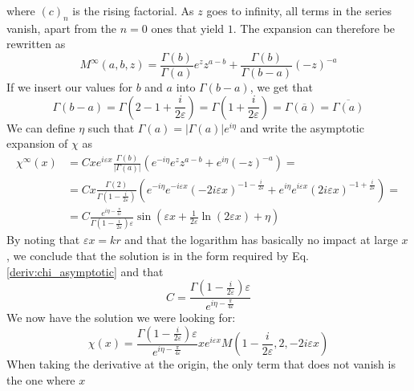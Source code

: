 where \((c)_n\) is the rising factorial. As \(z\) goes to infinity, all terms in the series vanish, apart from the \(n=0\) ones that yield \(1\). The expansion can therefore be rewritten as
\begin{equation}\label{deriv:Mexpansion}
	M^{\infty} (a,b,z) =
	\frac{\Gamma (b)}{\Gamma (a)} e^z z^{a-b} +
	\frac{\Gamma (b)}{\Gamma (b-a)}(-z)^{-a}
\end{equation}
If we insert our values for \(b\) and \(a\) into \(\Gamma (b-a)\), we get that
\begin{equation}
	\Gamma (b-a) = \Gamma \left( 2- 1 + \frac{i}{2\varepsilon } \right) = \Gamma \left( 1+ \frac{i}{2 \varepsilon } \right) = \Gamma (\overline{a})= \overline{\Gamma (a)}
\end{equation}
We can define \(\eta \) such that \(\Gamma (a) = \vert \Gamma (a) \vert e^{i \eta } \) and write the asymptotic expansion of \(\chi \) as
\begin{align}
	\chi^{\infty}(x) &= Cxe^{i\varepsilon x} \frac{\Gamma (b)}{\vert \Gamma (a) \vert }
	\left( e^{-i \eta } e^z	z^{a-b} + e^{i \eta } (-z)^{-a}  \right) =\\
	&= C x \frac{\Gamma (2)}{\Gamma \left(1-\frac{i}{2\varepsilon }\right)}\left( e^{-i \eta } e^{-i\varepsilon x}(-2i\varepsilon x)^{-1-\frac{i}{2\varepsilon }} + e^{i \eta } e^{i \varepsilon x} (2i \varepsilon x)^{-1+ \frac{i}{2\varepsilon }} \right)=\\
	&=C \frac{e^{i \eta - \frac{\pi}{4 \varepsilon }}}{\Gamma \left( 1-\frac{i}{2\varepsilon } \right) \varepsilon } \sin \left( \varepsilon x + \frac{1}{2\varepsilon} \ln (2\varepsilon x) + \eta \right)
\end{align}
By noting that \(\varepsilon x= kr\) and that the logarithm has basically no impact at large \(x\), we conclude that the solution is in the form required by Eq. \eqref{deriv:chi_asymptotic} and that
\begin{equation}
	C = \frac{\Gamma \left( 1- \frac{i}{2\varepsilon }\right) \varepsilon }{e^{i \eta - \frac{\pi}{4 \varepsilon }}}
\end{equation}
We now have the solution we were looking for:
\begin{equation}\label{deriv:solution}
	\chi (x) = \frac{\Gamma \left(1-\frac{i}{2\varepsilon }\right) \varepsilon }{e^{i \eta - \frac{\pi}{4 \varepsilon }}}x e^{i\varepsilon x}M\left(1-\frac{i}{2\varepsilon },2,-2i \varepsilon x\right) 
\end{equation}
When taking the derivative at the origin, the only term that does not vanish is the one where \(x\)